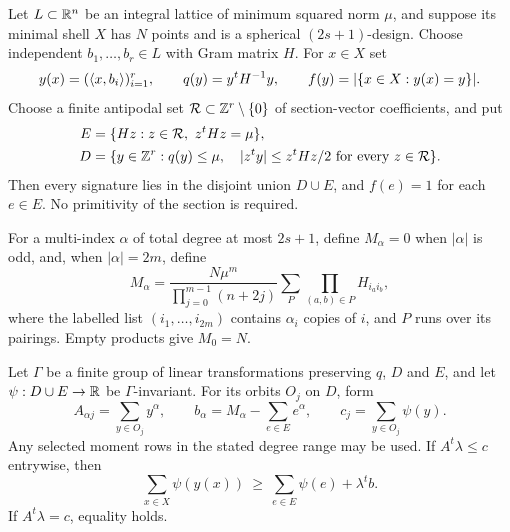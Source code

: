 \begin{proposition}\label{prop:section-statistics}
Let $L\subset\mathbb R^n$ be an integral lattice of minimum squared norm $\mu$,
and suppose its minimal shell $X$ has $N$ points and is a spherical
$(2s+1)$-design. Choose independent $b_1,\ldots,b_r\in L$ with Gram
matrix $H$. For $x\in X$ set
\[
y(x)=(\langle x,b_i\rangle)_{i=1}^r,\qquad
q(y)=y^tH^{-1}y,\qquad f(y)=|\{x\in X:y(x)=y\}|.
\]
Choose a finite antipodal set $\mathcal R\subset\mathbb Z^r\setminus\{0\}$
of section-vector coefficients, and put
\begin{equation}\label{eq:section-domain}
\begin{split}
E&=\{Hz:z\in\mathcal R,\ z^tHz=\mu\},\\
D&=\{y\in\mathbb Z^r:q(y)\le\mu,\quad
             |z^ty|\le z^tHz/2\ \text{for every }z\in\mathcal R\}.
\end{split}
\end{equation}
Then every signature lies in the disjoint union $D\cup E$, and
$f(e)=1$ for each $e\in E$. No primitivity of the section is required.

For a multi-index $\alpha$ of total degree at most $2s+1$, define
$M_\alpha=0$ when $|\alpha|$ is odd, and, when $|\alpha|=2m$, define
\begin{equation}\label{eq:section-moments}
M_\alpha=
\frac{N\mu^m}{\prod_{j=0}^{m-1}(n+2j)}
\sum_P\prod_{(a,b)\in P}H_{i_a i_b},
\end{equation}
where the labelled list $(i_1,\ldots,i_{2m})$ contains $\alpha_i$
copies of $i$, and $P$ runs over its pairings. Empty products give
$M_0=N$.

Let $\Gamma$ be a finite group of linear transformations preserving
$q$, $D$ and $E$, and let $\psi:D\cup E\to\mathbb R$ be $\Gamma$-invariant.
For its orbits $O_j$ on $D$, form
\[
A_{\alpha j}=\sum_{y\in O_j}y^\alpha,\qquad
b_\alpha=M_\alpha-\sum_{e\in E}e^\alpha,\qquad
c_j=\sum_{y\in O_j}\psi(y).
\]
Any selected moment rows in the stated degree range may be used. If
$A^t\lambda\le c$ entrywise, then
\begin{equation}\label{eq:section-statistic-bound}
\sum_{x\in X}\psi(y(x))\ \ge\
\sum_{e\in E}\psi(e)+\lambda^tb.
\end{equation}
If $A^t\lambda=c$, equality holds.
\end{proposition}
